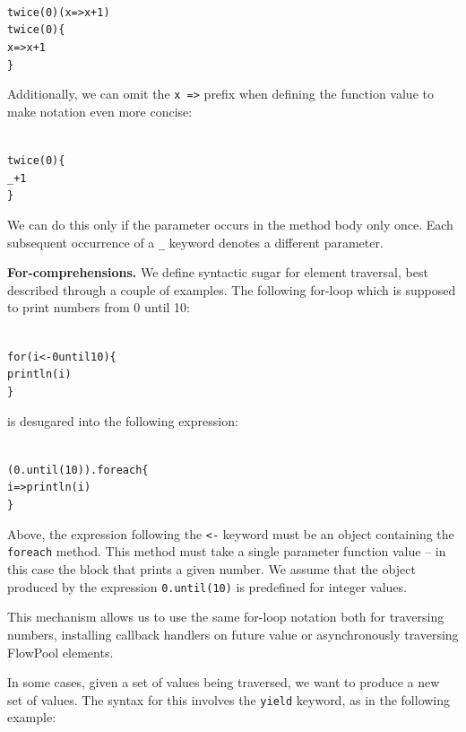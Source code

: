 \documentclass[runningheads,a4paper]{llncs}
\begin{document}
\begin{minipage}[b]{3.75 cm}
\begin{alltt}
{\scriptsize
twice(0)(x => x + 1)
twice(0) \{
  x => x + 1
\}
}
\end{alltt}
\end{minipage}

Additionally, we can omit the \verb+x =>+ prefix when defining the function value to
make notation even more concise:

\begin{minipage}[b]{3.75 cm}
\begin{alltt}
{\scriptsize
twice(0) \{
  _ + 1
\}
}
\end{alltt}
\end{minipage}

We can do this only if the parameter occurs in the method body only once. Each subsequent
occurrence of a \verb=_= keyword denotes a different parameter.


\textbf{For-comprehensions.}
We define syntactic sugar for element traversal, best described through a couple of
examples.
The following for-loop which is supposed to print numbers from 0 until 10:

\begin{minipage}[b]{3.75 cm}
\begin{alltt}
{\scriptsize
for (i <- 0 until 10) \{
  println(i)
\}
}
\end{alltt}
\end{minipage}

is desugared into the following expression:

\begin{minipage}[b]{3.75 cm}
\begin{alltt}
{\scriptsize
(0.until(10)).foreach \{
  i => println(i)
\}
}
\end{alltt}
\end{minipage}

Above, the expression following the \verb=<-= keyword must be an object containing
the \verb=foreach= method.
This method must take a single parameter function value -- in this case the block
that prints a given number.
We assume that the object produced by the expression \verb=0.until(10)= is
predefined for integer values.

This mechanism allows us to use the same for-loop notation both for traversing
numbers, installing callback handlers on future value or asynchronously traversing
FlowPool elements.

In some cases, given a set of values being traversed, we want to produce a new
set of values.
The syntax for this involves the \verb=yield= keyword, as in the following example:
\end{document}
